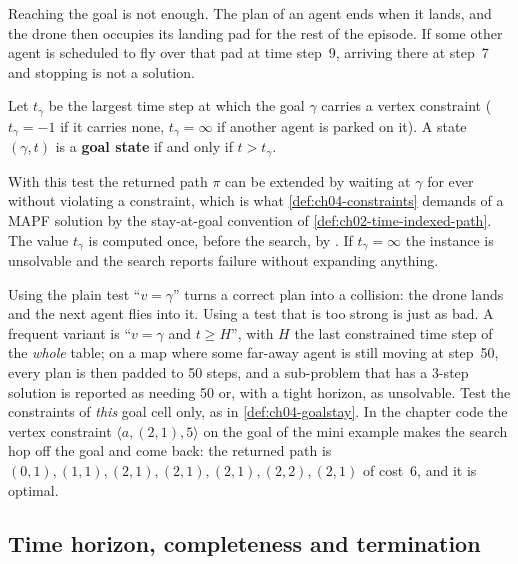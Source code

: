 Reaching the goal is not enough. The plan of an agent ends when it lands, and
the drone then occupies its landing pad for the rest of the episode. If some
other agent is scheduled to fly over that pad at time step~9, arriving there at
step~7 and stopping is not a solution.

\begin{definition}
\label{def:ch04-goalstay}
Let $t_\gamma$ be the largest time step at which the goal $\gamma$ carries a
vertex constraint ($t_\gamma = -1$ if it carries none, $t_\gamma = \infty$ if
another agent is parked on it). A state $(\gamma, t)$ is a
\textbf{goal state} if and only if $t > t_\gamma$.
\end{definition}

With this test the returned path $\pi$ can be extended by waiting at $\gamma$ for
ever without violating a constraint, which is what \cref{def:ch04-constraints}
demands of a MAPF solution by the stay-at-goal convention of
\cref{def:ch02-time-indexed-path}. The value $t_\gamma$ is computed once, before the
search, by . If $t_\gamma = \infty$ the instance is
unsolvable and the search reports failure without expanding anything.

\begin{pitfall}
Using the plain test ``$v = \gamma$'' turns a correct plan into a collision:
the drone lands and the next agent flies into it. Using a test that is too
strong is just as bad. A frequent variant is ``$v = \gamma$ and $t \ge H$'',
with $H$ the last constrained time step of the \emph{whole} table; on a map
where some far-away agent is still moving at step~50, every plan is then padded
to 50 steps, and a sub-problem that has a 3-step solution is reported as
needing 50 or, with a tight horizon, as unsolvable. Test the constraints of
\emph{this} goal cell only, as in \cref{def:ch04-goalstay}. In the chapter code
the vertex constraint $\langle a, (2,1), 5\rangle$ on the goal of the mini
example makes the search hop off the goal and come back: the returned path is
$(0,1), (1,1), (2,1), (2,1), (2,1), (2,2), (2,1)$ of cost~6, and it is optimal.
\end{pitfall}

\subsection{Time horizon, completeness and termination}
\label{sec:ch04-horizon}

